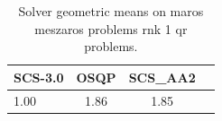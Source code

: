 \begin{table}
\centering
\caption{Solver geometric means on maros meszaros problems rnk 1 qr problems.}
\label{t-maros meszaros problems rnk 1 qr-geom_mean}
\begin{tabular}{lccc}
\toprule
 SCS-3.0 &  OSQP &  SCS\_AA2 \\
\midrule
    1.00 &  1.86 &     1.85 \\
\bottomrule
\end{tabular}
\end{table}
